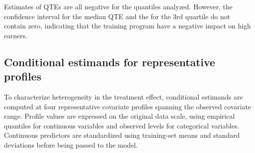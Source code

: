 \documentclass[preprint,12pt,authoryear]{elsarticle}
\makeatletter
\newcommand\code{\bgroup\@makeother\_\@makeother\~\@makeother\$\@codex}
\def\@codex#1{{\normalfont\ttfamily\hyphenchar\font=-1 #1}\egroup}
\makeatother
\begin{document}
Estimates of QTEs are all negative for the quantiles analyzed. However, the confidence interval for the median QTE and the for the 3rd quartile do not contain zero, indicating that the training program have a negative impact on high earners.


\subsection{Conditional estimands for representative profiles}

To characterize heterogeneity in the treatment effect, conditional estimands are computed at four representative covariate profiles spanning the observed covariate range. Profile values are expressed on the original data scale, using empirical quantiles for continuous variables and observed levels for categorical variables. Continuous predictors are standardized using training-set means and standard deviations before being passed to the model.



\begin{table}
\centering
\caption{\label{tab:xnew-results}Representative Lalonde participant profiles used as new-data inputs for the conditional causal contrasts reported in Figure~\ref{fig:cate_plot} and in the printed CQTE summary below. Columns (Profile~1--Profile~4) give the covariate values for one synthetic individual on the original data scale: \code{age} (years), \code{educ} (years of schooling), \code{race}, \code{married}, \code{nodegree}, and prior annual earnings \code{re74} and \code{re75} (US dollars).}
\centering
{}
\end{table}
\end{document}
